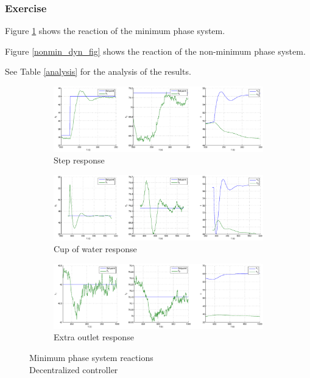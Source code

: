 \subsubsection{Exercise} 


Figure \ref{min_dyn_fig} shows the reaction of the minimum phase system.

Figure \ref{nonmin_dyn_fig} shows the reaction of the non-minimum phase system.

See Table \ref{analysis} for the analysis of the results. 

\begin{figure}[h!t]
        \centering
        \begin{subfigure}[b]{\columnwidth}
                \includegraphics[width=\columnwidth]{fig/min_dyn_step.eps}
                \caption{Step response}
        \end{subfigure}
        \begin{subfigure}[b]{\columnwidth}
                \includegraphics[width=\columnwidth]{fig/min_dyn_gob.eps}
                \caption{Cup of water response}
        \end{subfigure}
        \begin{subfigure}[b]{\columnwidth}
                \includegraphics[width=\columnwidth]{fig/min_dyn_fui.eps}
                \caption{Extra outlet response}
        \end{subfigure}
        \caption{Minimum phase system reactions \\ Decentralized controller}
        \label{min_dyn_fig}
\end{figure}

